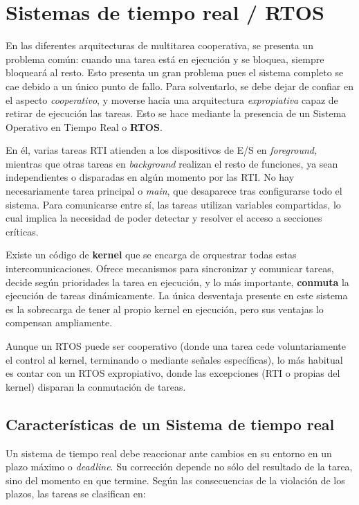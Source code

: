 \documentclass[../main.tex]{subfiles}
\begin{document}
\section{Sistemas de tiempo real / RTOS}

    En las diferentes arquitecturas de multitarea cooperativa, se presenta un problema común: cuando una tarea está en ejecución y se bloquea, siempre bloqueará al resto. Esto presenta un gran problema pues el sistema completo se cae debido a un único punto de fallo. Para solventarlo, se debe dejar de confiar en el aspecto \emph{cooperativo}, y moverse hacia una arquitectura \emph{expropiativa} capaz de retirar de ejecución las tareas. Esto se hace mediante la presencia de un Sistema Operativo en Tiempo Real o \textbf{RTOS}.

    En él, varias tareas RTI atienden a los dispositivos de E/S en \emph{foreground}, mientras que otras tareas en \emph{background} realizan el resto de funciones, ya sean independientes o disparadas en algún momento por las RTI. No hay necesariamente tarea principal o \emph{main}, que desaparece tras configurarse todo el sistema. Para comunicarse entre sí, las tareas utilizan variables compartidas, lo cual implica la necesidad de poder detectar y resolver el acceso a secciones críticas.

    Existe un código de \textbf{kernel} que se encarga de orquestrar todas estas intercomunicaciones. Ofrece mecanismos para sincronizar y comunicar tareas, decide según prioridades la tarea en ejecución, y lo más importante, \textbf{conmuta} la ejecución de tareas dinámicamente. La única desventaja presente en este sistema es la sobrecarga de tener al propio kernel en ejecución, pero sus ventajas lo compensan ampliamente.

    Aunque un RTOS puede ser cooperativo (donde una tarea cede voluntariamente el control al kernel, terminando o mediante señales específicas), lo más habitual es contar con un RTOS expropiativo, donde las excepciones (RTI o propias del kernel) disparan la conmutación de tareas. 

    \subsection{Características de un Sistema de tiempo real}

        Un sistema de tiempo real debe reaccionar ante cambios en su entorno en un plazo máximo o \emph{deadline}. Su corrección depende no sólo del resultado de la tarea, sino del momento en que termine. Según las consecuencias de la violación de los plazos, las tareas se clasifican en:
\end{document}
